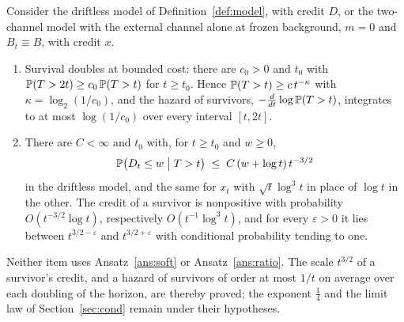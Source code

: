 \begin{corollary}\label{cor:strengthscale}
Consider the driftless model of Definition~\ref{def:model}, with credit
$D$, or the two-channel model with the external channel alone at frozen
background, $m=0$ and $B_t\equiv B$, with credit $x$.
\begin{enumerate}[label=\emph{(\roman*)},itemsep=1pt]
\item Survival doubles at bounded cost: there are $c_0>0$ and $t_0$ with
$\mathbb{P}(T>2t)\ge c_0\,\mathbb{P}(T>t)$ for $t\ge t_0$. Hence
$\mathbb{P}(T>t)\ge c\,t^{-\kappa}$ with $\kappa=\log_2(1/c_0)$, and the hazard of
survivors, $-\frac{d}{dt}\log\mathbb{P}(T>t)$, integrates to at most
$\log(1/c_0)$ over every interval $[t,2t]$.
\item There are $C<\infty$ and $t_0$ with, for $t\ge t_0$ and $w\ge0$,
\[
\mathbb{P}\bigl(D_t\le w\bigm|T>t\bigr)\;\le\;C\,(w+\log t)\,t^{-3/2}
\]
in the driftless model, and the same for $x_t$ with $\sqrt t\log^3t$ in
place of $\log t$ in the other. The credit of a survivor is nonpositive
with probability $O(t^{-3/2}\log t)$, respectively $O(t^{-1}\log^3t)$, and
for every $\varepsilon>0$ it lies between $t^{3/2-\varepsilon}$ and
$t^{3/2+\varepsilon}$ with conditional probability tending to one.
\end{enumerate}
Neither item uses Ansatz~\ref{ans:soft} or Ansatz~\ref{ans:ratio}. The
scale $t^{3/2}$ of a survivor's credit, and a hazard of survivors of order
at most $1/t$ on average over each doubling of the horizon, are thereby
proved; the exponent $\tfrac14$ and the limit law of
Section~\ref{sec:cond} remain under their hypotheses.
\end{corollary}

